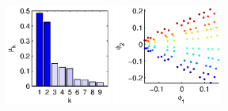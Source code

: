 \documentclass[3p]{elsarticle}
\begin{document}
\begin{figure}[t]
\centering
\def\figheight{1.3in}
%
\begin{subfigure}[t]{1.5in}
\centering
\includegraphics[height=\figheight]{chemotaxis1_evals}
\includegraphics[height=\figheight]{chemotaxis1_embed_good}
\vspace{1.2in}
\caption{}
\end{subfigure}
%
\begin{subfigure}[t]{1.5in}
\centering

\end{subfigure}
\end{figure}
\end{document}
